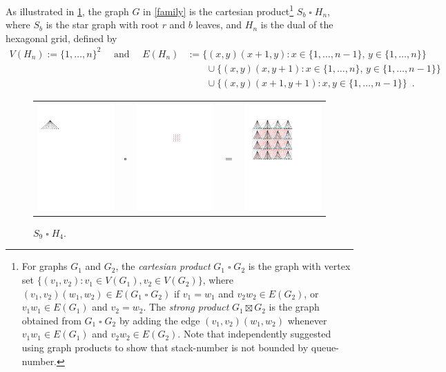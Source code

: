 \documentclass[kpfonts]{patmorin}
\newcommand{\CartProd}{\mathbin{\square}}
\begin{document}
As illustrated in \cref{graph}, the graph $G$ in \cref{family} is the cartesian product\footnote{For graphs $G_1$ and $G_2$, the \emph{cartesian product} $G_1\CartProd G_2$ is the graph with vertex set $\{(v_1,v_2): v_1 \in V(G_1), v_2 \in V(G_2)\}$, where $(v_1,v_2)(w_1,w_2)\in E(G_1\CartProd G_2)$ if $v_1=w_1$ and $v_2w_2\in E(G_2)$, or $v_1w_1\in E(G_1)$ and $v_2=w_2$. The \emph{strong product} $G_1\boxtimes G_2$ is the graph obtained from $G_1\CartProd G_2$ by adding the edge $(v_1,v_2)(w_1,w_2)$ whenever $v_1w_1\in E(G_1)$ and $v_2w_2\in E(G_2)$. Note that \citet{Pupyrev20} independently suggested using graph products to show that stack-number is not bounded by queue-number.} $S_b\CartProd H_n$, where $S_b$ is the star graph with root $r$ and $b$ leaves, and $H_n$ is the dual of the hexagonal grid, defined by
\begin{align*}
V(H_n)  :=\{1,\ldots,n\}^2 \quad \text{ and } \quad
E(H_n) & :=  \{(x,y)(x+1,y):x\in\{1,\ldots,n-1\},\,y\in\{1,\ldots,n\}\} \\
& \qquad \cup \{(x,y)(x,y+1):x\in\{1,\ldots,n\},\,y\in\{1,\ldots,n-1\}\} \\
& \qquad \cup \{(x,y)(x+1,y+1):x,y\in\{1,\ldots,n-1\}\} \enspace .
\end{align*}

\begin{figure}[H]
	\centering
	\begin{tabular}{m{}m{2ex}m{}m{2ex}m{}}
		\includegraphics[width=.3\textwidth]{figs/s} & $\CartProd$ & \includegraphics[width=.2\textwidth]{figs/q} & $=$
		& \includegraphics[width=.3\textwidth]{figs/product}
	\end{tabular}
	\caption{$S_9 \CartProd H_4$.}
	\label{graph}
\end{figure}
\end{document}
